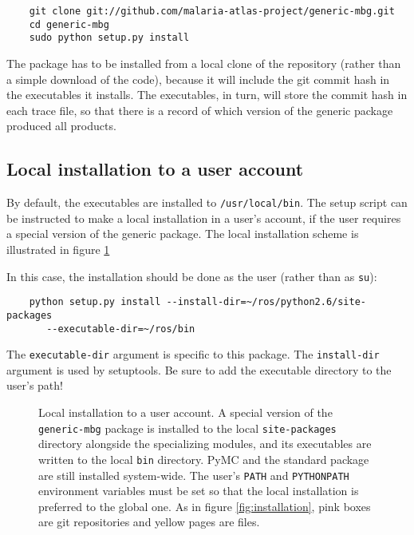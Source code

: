 \begin{verbatim}
    git clone git://github.com/malaria-atlas-project/generic-mbg.git
    cd generic-mbg
    sudo python setup.py install
\end{verbatim}

The package has to be installed from a local clone of the repository (rather than a simple download of the code), because it will include the git commit hash in the executables it installs. The executables, in turn, will store the commit hash in each trace file, so that there is a record of which version of the generic package produced all products.

\subsection{Local installation to a user account}
\label{sub:core-local} 
By default, the executables are installed to \texttt{/usr/local/bin}. The setup script can be instructed to make a local installation in a user's account, if the user requires a special version of the generic package. The local installation scheme is illustrated in figure \ref{fig:local-installation} 

In this case, the installation should be done as the user (rather than as \texttt{su}):
\begin{verbatim}
    python setup.py install --install-dir=~/ros/python2.6/site-packages
       --executable-dir=~/ros/bin 
\end{verbatim}
The \texttt{executable-dir} argument is specific to this package. The \texttt{install-dir} argument is used by setuptools. Be sure to add the executable directory to the user's path!

\begin{figure}[hhh]
    \begin{center}
    \end{center}
    \caption{Local installation to a user account. A special version of the \texttt{generic-mbg} package is installed to the local \texttt{site-packages} directory alongside the specializing modules, and its executables are written to the local \texttt{bin} directory. PyMC and the standard package are still installed system-wide. The user's \texttt{PATH} and \texttt{PYTHONPATH} environment variables must be set so that the local installation is preferred to the global one. As in figure \ref{fig:installation}, pink boxes are git repositories and yellow pages are files.}
    \label{fig:local-installation}
\end{figure}

